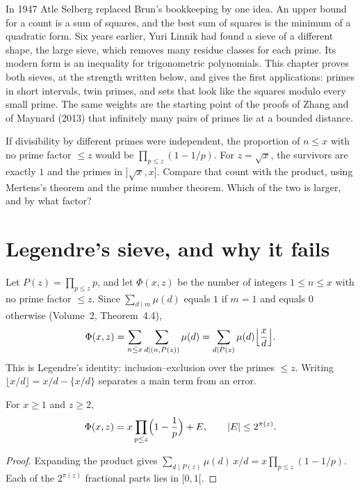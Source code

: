 
In 1947 Atle Selberg replaced Brun's bookkeeping by one idea. An upper bound for a count is a sum of squares, and the best sum of squares is the minimum of a quadratic form. Six years earlier, Yuri Linnik had found a sieve of a different shape, the large sieve, which removes many residue classes for each prime. Its modern form is an inequality for trigonometric polynomials. This chapter proves both sieves, at the strength written below, and gives the first applications: primes in short intervals, twin primes, and sets that look like the squares modulo every small prime. The same weights are the starting point of the proofs of Zhang and of Maynard (2013) that infinitely many pairs of primes lie at a bounded distance.

\begin{think}
If divisibility by different primes were independent, the proportion of $n\le x$ with no prime factor $\le z$ would be $\prod_{p\le z}(1-1/p)$. For $z=\sqrt x$, the survivors are exactly $1$ and the primes in $]\sqrt x,x]$. Compare that count with the product, using Mertens's theorem and the prime number theorem. Which of the two is larger, and by what factor?
\end{think}

\section{Legendre's sieve, and why it fails}

Let $P(z)=\prod_{p\le z}p$, and let $\Phi(x,z)$ be the number of integers $1\le n\le x$ with no prime factor $\le z$. Since $\sum_{d\mid m}\mu(d)$ equals $1$ if $m=1$ and equals $0$ otherwise (Volume~2, Theorem~4.4),
\[
\Phi(x,z)=\sum_{n\le x}\sum_{d\mid(n,P(z))}\mu(d)=\sum_{d\mid P(z)}\mu(d)\Bigl\lfloor\frac xd\Bigr\rfloor.
\]
This is Legendre's identity: inclusion--exclusion over the primes $\le z$. Writing $\lfloor x/d\rfloor=x/d-\{x/d\}$ separates a main term from an error.

\begin{proposition}[Legendre, 1808]\label{prop:legendre}
For $x\ge1$ and $z\ge2$,
\[
\Phi(x,z)=x\prod_{p\le z}\Bigl(1-\frac1p\Bigr)+E,\qquad|E|\le2^{\pi(z)}.
\]
\end{proposition}
\begin{proof}
Expanding the product gives $\sum_{d\mid P(z)}\mu(d)\,x/d=x\prod_{p\le z}(1-1/p)$. Each of the $2^{\pi(z)}$ fractional parts lies in $[0,1[$.
\end{proof}


